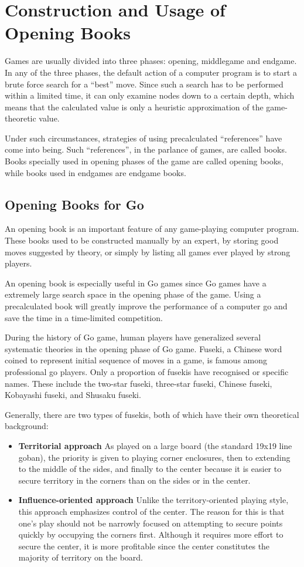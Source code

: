 \section{Construction and Usage of Opening Books}

Games are usually divided into three phases: opening, middlegame and endgame. In any of the three phases, the default action of a computer program is to start a brute force search for a ``best'' move. Since such a search has to be performed within a limited time, it can only examine nodes down to a certain depth, which means that the calculated value is only a heuristic approximation of the game-theoretic value.

Under such circumstances, strategies of using precalculated ``references'' have come into being. Such ``references'', in the parlance of games, are called books. Books specially used in opening phases of the game are called opening books, while books used in endgames are endgame books.


\subsection{Opening Books for Go}

An opening book is an important feature of any game-playing computer program. These books used to be constructed manually by an expert, by storing good moves suggested by theory, or simply by listing all games ever played by
strong players.

An opening book is especially useful in Go games since Go games have a extremely large search space in the opening phase of the game. Using a precalculated book will greatly improve the performance of a computer go and save the time in a time-limited competition.

During the history of Go game, human players have generalized several systematic theories in the opening phase of Go game. Fuseki, a Chinese word coined to represent initial sequence of moves in a game, is famous among professional go players. Only a proportion of fusekis have recognised or specific names. These include the two-star fuseki, three-star fuseki, Chinese fuseki, Kobayashi fuseki, and Shusaku fuseki.

Generally, there are two types of fusekis, both of which have their own theoretical background:
\begin{itemize}
\item \textbf{Territorial approach}
As played on a large board (the standard 19x19 line goban), the priority is given to playing corner enclosures, then to extending to the middle of the sides, and finally to the center because it is easier to secure territory in the corners than on the sides or in the center.
\item \textbf{Influence-oriented approach}
Unlike the territory-oriented playing style, this approach emphasizes control of the center. The reason for this is that one's play should not be narrowly focused on attempting to secure points quickly by occupying the corners first. Although it requires more effort to secure the center, it is more profitable since the center constitutes the majority of territory on the board.
\end{itemize}

